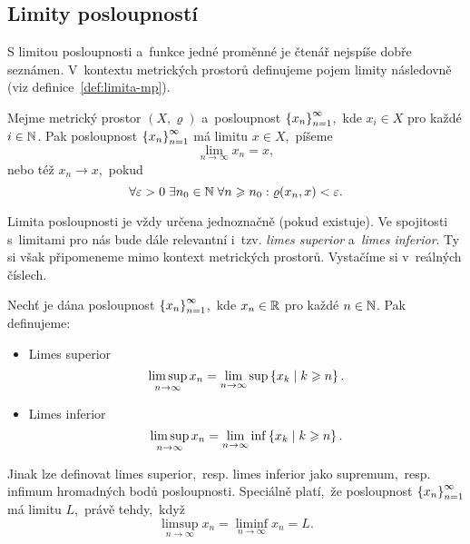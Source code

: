 \subsection{Limity posloupností}\label{subsec:limity-posl-mp}

S limitou posloupnosti a~funkce jedné proměnné je čtenář nejspíše dobře seznámen. V~kontextu metrických prostorů definujeme pojem limity následovně (viz definice~\ref{def:limita-mp}).
\begin{definition}\label{def:limita-mp}
    Mejme metrický prostor $(X,\varrho)$ a~posloupnost $\left\{x_n\right\}_{n=1}^\infty$,~kde $x_i\in X$ pro každé $i\in\mathbb{N}$. Pak posloupnost $\left\{x_n\right\}_{n=1}^\infty$ má limitu $x\in X$,~píšeme
    \[\lim_{n\to\infty}x_n=x,\]
    nebo též $x_n\to x$,~pokud
    \[\forall\varepsilon>0\;\exists n_0\in\mathbb{N}\;\forall n\geqslant n_0: \varrho(x_n,x)<\varepsilon.\]
\end{definition}
Limita posloupnosti je vždy určena jednoznačně (pokud existuje). Ve spojitosti s~limitami pro nás bude dále relevantní i~tzv. \emph{limes superior} a~\emph{limes inferior}. Ty si však připomeneme mimo kontext metrických prostorů. Vystačíme si v~reálných číslech.
\begin{definition}\label{def:limsup-liminf-mp}
    Nechť je dána posloupnost $\left\{x_n\right\}_{n=1}^\infty$,~kde $x_n\in\mathbb{R}$ pro každé $n\in\mathbb{N}$. Pak definujeme:
    \begin{itemize}
        \item Limes superior
        \[\limsup_{n\to\infty}x_n=\lim_{n\to\infty}\sup\left\{x_k\mid k\geqslant n\right\}.\]
        \item Limes inferior
        \[\limsup_{n\to\infty}x_n=\lim_{n\to\infty}\inf\left\{x_k\mid k\geqslant n\right\}.\]
    \end{itemize}
\end{definition}
Jinak lze definovat limes superior,~resp. limes inferior jako supremum,~resp. infimum hromadných bodů posloupnosti. Speciálně platí,~že posloupnost $\left\{x_n\right\}_{n=1}^\infty$ má limitu $L$,~právě tehdy,~když
\[\limsup_{n\to\infty}x_n=\liminf_{n\to\infty}x_n=L.\]

